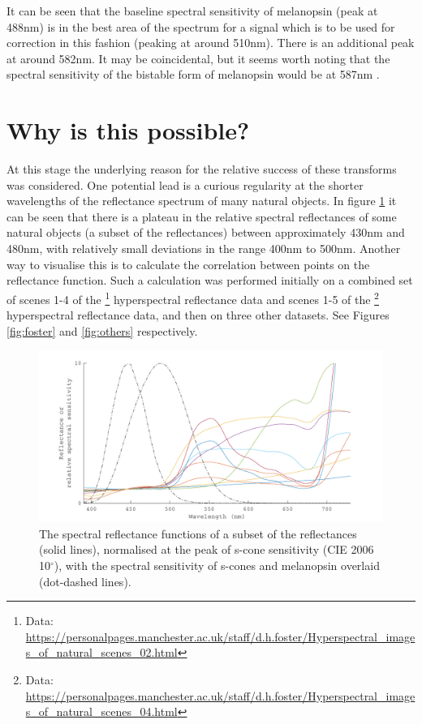 It can be seen that the baseline spectral sensitivity of melanopsin (peak at 488nm) is in the best area of the spectrum for a signal which is to be used for correction in this fashion (peaking at around 510nm). There is an additional peak at around 582nm. It may be coincidental, but it seems worth noting that the spectral sensitivity of the bistable form of melanopsin would be at 587nm \citep{mure_melanopsin_2009}.



\section{Why is this possible?}


At this stage the underlying reason for the relative success of these transforms was considered. One potential lead is a curious regularity at the shorter wavelengths of the reflectance spectrum of many natural objects. In figure \ref{fig:plateau} it can be seen that there is a plateau in the relative spectral reflectances of some natural objects (a subset of the \citet{vrhel_measurement_1994} reflectances) between approximately 430nm and 480nm, with relatively small deviations in the range 400nm to 500nm. Another way to visualise this is to calculate the correlation between points on the reflectance function. Such a calculation was performed initially on a combined set of scenes 1-4 of the
\citet{nascimento_statistics_2002}\footnote{Data: \url{https://personalpages.manchester.ac.uk/staff/d.h.foster/Hyperspectral_images_of_natural_scenes_02.html}} hyperspectral reflectance data and
scenes 1-5 of the 
\citet{foster_frequency_2006}\footnote{Data: \url{https://personalpages.manchester.ac.uk/staff/d.h.foster/Hyperspectral_images_of_natural_scenes_04.html}}
hyperspectral reflectance data, and then on three other datasets. See Figures \ref{fig:foster} and \ref{fig:others} respectively.

\begin{figure}[htbp] %
 \includegraphics[max width=\textwidth]{figs/comp/melcomp_2_caller/plateau.pdf}
 \caption{The spectral reflectance functions of a subset of the \citet{vrhel_measurement_1994} reflectances (solid lines), normalised at the peak of s-cone sensitivity (CIE 2006 10$^{\circ}$), with the spectral sensitivity of s-cones and melanopsin \citep{lucas_measuring_2014} overlaid (dot-dashed lines).}
 \label{fig:plateau}
\end{figure} 

